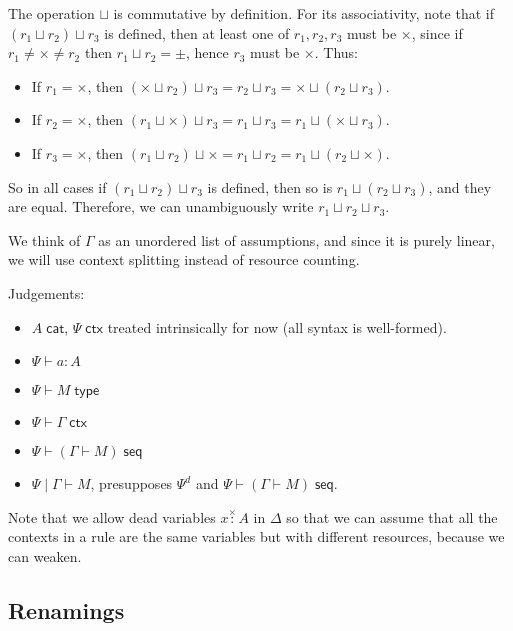 \documentclass{amsart}
\let\types\vdash %
\def\cb{\mid} %
\let\mypm\pm
\def\pm{^\mypm}
\newcommand\uns{\times}
\def\pms{\mypm}
\def\cat{\;\mathsf{cat}}
\def\type{\;\mathsf{type}}
\def\ctx{\;\mathsf{ctx}}
\def\uncol{\overset{\scriptscriptstyle \times}{:}}
\def\ok{\;\mathsf{seq}}
\newcommand\combine{\sqcup}
\begin{document}
The operation $\combine$ is commutative by definition.
For its associativity, note that if $(r_1 \combine r_2) \combine r_3$ is defined, then at least one of $r_1,r_2,r_3$ must be $\uns$, since if $r_1\neq\uns\neq r_2$ then $r_1\combine r_2 = \pms$, hence $r_3$ must be $\uns$.
Thus:
\begin{itemize}
\item If $r_1=\uns$, then $(\uns \combine r_2) \combine r_3 = r_2 \combine r_3 = \uns \combine (r_2\combine r_3)$.
\item If $r_2=\uns$, then $(r_1 \combine \uns) \combine r_3 = r_1 \combine r_3 = r_1 \combine (\uns\combine r_3)$.
\item If $r_3=\uns$, then $(r_1 \combine r_2) \combine \uns = r_1 \combine r_2 = r_1 \combine (r_2\combine \uns)$.
\end{itemize}
So in all cases if $(r_1 \combine r_2) \combine r_3$ is defined, then so is $r_1 \combine (r_2\combine r_3)$, and they are equal.
Therefore, we can unambiguously write $r_1 \combine r_2 \combine r_3$.

We think of $\Gamma$ as an unordered list of assumptions, and since it
is purely linear, we will use context splitting instead of resource
counting.  

Judgements:

\begin{itemize}

\item $A \cat$, $\Psi \ctx$ treated intrinsically for now (all syntax is
  well-formed).

\item $\Psi \types a : A$

\item $\Psi \types M \type$

\item $\Psi \types \Gamma \ctx$

\item $\Psi \types (\Gamma \vdash M) \ok$

\item $\Psi \cb \Gamma \vdash M$, presupposes 
 $\Psi^d$ and 
 $\Psi \types (\Gamma \vdash M) \ok$.  

\end{itemize}

Note that we allow dead variables $x \uncol A$ in $\Delta$ so that we
can assume that all the contexts in a rule are the same variables but
with different resources, because we can weaken.  

\subsection*{Renamings}
\end{document}
